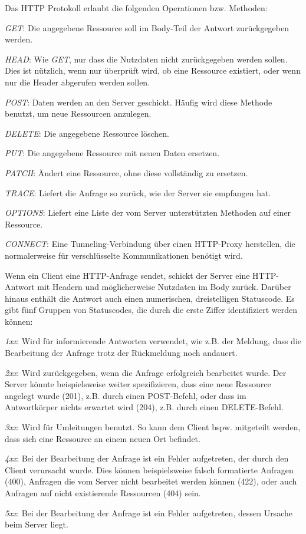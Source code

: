 Das HTTP Protokoll erlaubt die folgenden Operationen bzw. Methoden:

\begin{description}
	\item \emph{GET}: Die angegebene Ressource soll im Body-Teil der Antwort zurückgegeben werden.
	\item \emph{HEAD}: Wie \emph{GET}, nur dass die Nutzdaten nicht zurückgegeben werden sollen. Dies ist nützlich, wenn nur überprüft wird, ob eine Ressource existiert, oder wenn nur die Header abgerufen werden sollen.
	\item \emph{POST}: Daten werden an den Server geschickt. Häufig wird diese Methode benutzt, um neue Ressourcen anzulegen.
	\item \emph{DELETE}: Die angegebene Ressource löschen.
	\item \emph{PUT}: Die angegebene Ressource mit neuen Daten ersetzen.
	\item \emph{PATCH}: Ändert eine Ressource, ohne diese vollständig zu ersetzen.
	\item \emph{TRACE}: Liefert die Anfrage so zurück, wie der Server sie empfangen hat.
	\item \emph{OPTIONS}: Liefert eine Liste der vom Server unterstützten Methoden auf einer Ressource.
	\item \emph{CONNECT}: Eine Tunneling-Verbindung über einen HTTP-Proxy herstellen, die normalerweise für verschlüsselte Kommunikationen benötigt wird.
\end{description}

Wenn ein Client eine HTTP-Anfrage sendet, schickt der Server eine HTTP-Antwort mit Headern und möglicherweise Nutzdaten im Body zurück. Darüber hinaus enthält die Antwort auch einen numerischen, dreistelligen Statuscode. Es gibt fünf Gruppen von Statuscodes, die durch die erste Ziffer identifiziert werden können:

\begin{description}
	\item \emph{1xx}: Wird für informierende Antworten verwendet, wie z.B. der Meldung, dass die Bearbeitung der Anfrage trotz der Rückmeldung noch andauert.
	\item \emph{2xx}: Wird zurückgegeben, wenn die Anfrage erfolgreich bearbeitet wurde. Der Server könnte beispielsweise weiter spezifizieren, dass eine neue Ressource angelegt wurde (201), z.B. durch einen POST-Befehl, oder dass im Antwortkörper nichts erwartet wird (204), z.B. durch einen DELETE-Befehl.
	\item \emph{3xx}: Wird für Umleitungen benutzt. So kann dem Client bspw. mitgeteilt werden, dass sich eine Ressource an einem neuen Ort befindet.
	\item \emph{4xx}: Bei der Bearbeitung der Anfrage ist ein Fehler aufgetreten, der durch den Client verursacht wurde. Dies können beispielsweise falsch formatierte Anfragen (400), Anfragen die vom Server nicht bearbeitet werden können (422), oder auch Anfragen auf nicht existierende Ressourcen (404) sein.
	\item \emph{5xx}: Bei der Bearbeitung der Anfrage ist ein Fehler aufgetreten, dessen Ursache beim Server liegt. 
\end{description}


